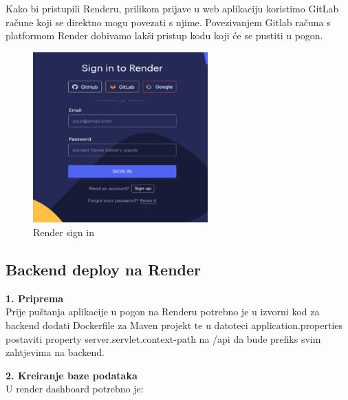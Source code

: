                 Kako bi pristupili Renderu, prilikom prijave u web aplikaciju koristimo GitLab račune koji se direktno mogu povezati s njime. Povezivanjem Gitlab računa s platformom Render dobivamo lakši pristup kodu koji će se pustiti u pogon.

                \begin{figure}[H]
				\includegraphics[width=0.6\textwidth,height=0.3\textheight]{slike/renderSignIn.png}
				\centering
				\caption{Render sign in}
				\label{fig:renderSignIn}
			\end{figure}

                \subsection{Backend deploy na Render}

                \textbf{1. Priprema}\\
                
                Prije puštanja aplikacije u pogon na Renderu potrebno je u izvorni kod za backend dodati Dockerfile za Maven projekt te u datoteci application.properties postaviti property server.servlet.context-path na /api da bude prefiks svim zahtjevima na backend.
			
			\eject 

                \textbf{2. Kreiranje baze podataka}\\

                U render dashboard potrebno je:

